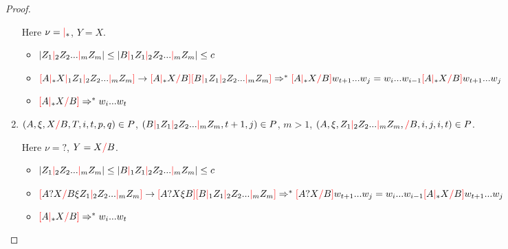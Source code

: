 \documentclass[main.tex]{subfiles}
\begin{document}
\begin{proof}
\begin{enumerate}
        Here $\nu = \mc_*$, $Y = X$.
        \begin{itemize}
            \item $|Z_1 \mc_2 Z_2 ... \mc_m Z_m| \leq |B \mc_1 Z_1 \mc_2 Z_2 ... \mc_m Z_m| \leq c$
            \item $
                \lb A \mc_* X \mc_1 Z_1 \mc_2 Z_2 ... \mc_m Z_m \rb
                \rightarrow
                \lb A \mc_* X \rc B \rb \lb B \mc_1 Z_1 \mc_2 Z_2 ... \mc_m Z_m \rb
                \\
                \Rightarrow^* \lb A \mc_* X \rc B \rb w_{t + 1} ... w_j
                = w_i ... w_{i - 1} \lb A \mc_* X \rc B \rb w_{t + 1} ... w_j
                $
            \item $\lb A \mc_* X \rc B \rb \Rightarrow^* w_i ... w_t$
        \end{itemize}

    \item $(A, \xi, X \rc B, T, i, t, p, q) \in P$,
        $(B \mc_1 Z_1 \mc_2 Z_2 ... \mc_m Z_m, t + 1, j) \in P$,
        $m > 1$,
        $(A, \xi, Z_1 \mc_2 Z_2 ... \mc_m Z_m, \rc B, i, j, i, t) \in P$.

        Here $\nu = ?$, $Y = X \rc B$.
        \begin{itemize}
            \item $|Z_1 \mc_2 Z_2 ... \mc_m Z_m| \leq |B \mc_1 Z_1 \mc_2 Z_2 ... \mc_m Z_m| \leq c$
            \item $
                \lb A ? X \rc B \xi Z_1 \mc_2 Z_2 ... \mc_m Z_m \rb
                \rightarrow
                \lb A ? X \xi B \rb \lb B \mc_1 Z_1 \mc_2 Z_2 ... \mc_m Z_m \rb
                \\
                \Rightarrow^* \lb A ? X \rc B \rb w_{t + 1} ... w_j
                = w_i ... w_{i - 1} \lb A \mc_* X \rc B \rb w_{t + 1} ... w_j
                $
            \item $\lb A \mc_* X \rc B \rb \Rightarrow^* w_i ... w_t$
        \end{itemize}




\end{enumerate}
\end{proof}
\end{document}
